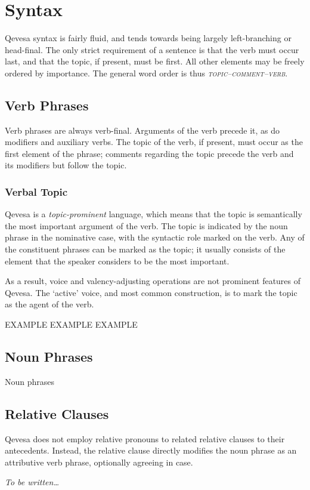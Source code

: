 \documentclass[grammar]{subfiles}
\begin{document}
	\chapter{Syntax}
	\label{ch:syntax}

	Qevesa syntax is fairly fluid, and tends towards being largely left-branching or head-final. The only strict requirement of a sentence is that the verb must occur last, and that the topic, if present, must be first. All other elements may be freely ordered by importance. The general word order is thus \emph{\textsc{topic–comment–verb}}.

	\section{Verb Phrases}
	\label{sec:syn_verb_phrases}

	Verb phrases are always verb-final. Arguments of the verb precede it, as do modifiers and auxiliary verbs. The topic of the verb, if present, must occur as the first element of the phrase; comments regarding the topic precede the verb and its modifiers but follow the topic.

	\subsection{Verbal Topic}
	\label{ssec:syn_verbal_topic}

	Qevesa is a \emph{topic-prominent} language, which means that the topic is semantically the most important argument of the verb. The topic is indicated by the noun phrase in the nominative case, with the syntactic role marked on the verb. Any of the constituent phrases can be marked as the topic; it usually consists of the element that the speaker considers to be the most important.

	As a result, voice and valency-adjusting operations are not prominent features of Qevesa. The ‘active’ voice, and most common construction, is to mark the topic as the agent of the verb.

	\begin{exe}
		\ex
		\begin{xlist}
			\ex EXAMPLE
			\ex EXAMPLE
			\ex EXAMPLE
		\end{xlist}
	\end{exe}

	\section{Noun Phrases}
	\label{sec:syn_noun_phrases}

	Noun phrases 

	\section{Relative Clauses}
	\label{sec:syn_relative_clauses}

	Qevesa does not employ relative pronouns to related relative clauses to their antecedents. Instead, the relative clause directly modifies the noun phrase as an attributive verb phrase, optionally agreeing in case.

	\emph{To be written…}
\end{document}
